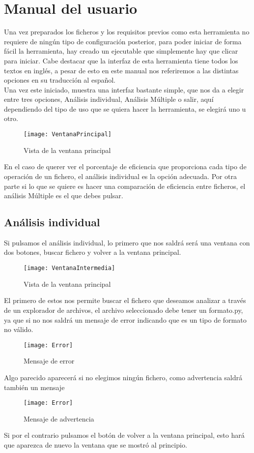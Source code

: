 \section{Manual del usuario}

Una vez preparados los ficheros y los requisitos previos como esta herramienta no requiere de ningún tipo de configuración posterior, para poder iniciar de forma fácil la herramienta, hay creado un ejecutable que simplemente hay que clicar para iniciar. Cabe destacar que la interfaz de esta herramienta tiene todos los textos en inglés, a pesar de esto en este manual nos referiremos a las distintas opciones en su traducción al español.\\

Una vez este iniciado, muestra una interfaz bastante simple, que nos da a elegir entre tres opciones, Análisis individual, Análisis Múltiple o salir, aquí dependiendo del tipo de uso que se quiera hacer la herramienta, se elegirá uno u otro.\\

\begin{figure}[H]
\centering
\texttt{[image: VentanaPrincipal]}
\caption{Vista de la ventana principal}
\end{figure}

En el caso de querer ver el porcentaje de eficiencia que proporciona cada tipo de operación de un fichero, el análisis individual es la opción adecuada.
Por otra parte si lo que se quiere es hacer una comparación de eficiencia entre ficheros, el análisis Múltiple es el que debes pulsar.


\subsection{Análisis individual}

Si pulsamos el análisis individual, lo primero que nos saldrá será una ventana con dos botones, buscar fichero y volver a la ventana principal.\\
\begin{figure}[H]
\centering
\texttt{[image: VentanaIntermedia]}
\caption{Vista de la ventana principal}
\end{figure}
El primero de estos nos permite buscar el fichero que deseamos analizar a través de un explorador de archivos, el archivo seleccionado debe tener un formato.py, ya que si no nos saldrá un mensaje de error indicando que es un tipo de formato no válido.\\
\begin{figure}[H]
\centering
\texttt{[image: Error]}
\caption{Mensaje de error}
\end{figure}
Algo parecido aparecerá si no elegimos ningún fichero, como advertencia saldrá  también un mensaje\\
\begin{figure}[H]
\centering
\texttt{[image: Error]}
\caption{Mensaje de advertencia}
\end{figure}
Si por el contrario pulsamos el botón de volver a la ventana principal, esto hará que aparezca de nuevo la ventana que se mostró al principio.\\


